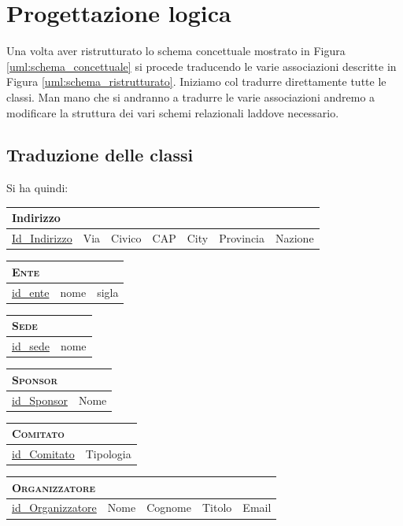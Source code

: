\section{Progettazione logica}
Una volta aver ristrutturato lo schema concettuale mostrato in Figura \ref{uml:schema_concettuale} si procede traducendo le varie associazioni descritte in Figura \ref{uml:schema_ristrutturato}. Iniziamo col tradurre direttamente tutte le classi. Man mano che si andranno a tradurre le varie associazioni andremo a modificare la struttura dei vari schemi relazionali laddove necessario.
\subsection{Traduzione delle classi}
Si ha quindi:

	\begin{tabular}{|l|l|l|l|l|l|l|}
		\multicolumn{7}{l}{Indirizzo} \\
		\hline
		\underline{Id\_Indirizzo} & Via & Civico & CAP & City & Provincia & Nazione \\ \hline
	\end{tabular}
	
	\begin{tabular}{|l|l|l|}
		\multicolumn{3}{l}{\textsc{Ente}}\\ \hline
		\underline{id\_ente} & nome & sigla \\ \hline
	\end{tabular}


	\begin{tabular}{|l|l|}
		\multicolumn{2}{l}{\textsc{Sede}} \\ \hline
		\underline{id\_sede} & nome \\ \hline
	\end{tabular}


	\begin{tabular}{|l|l|}
		\multicolumn{2}{l}{\textsc{Sponsor}} \\ \hline
		\underline{id\_Sponsor} & Nome \\ \hline
	\end{tabular}


	\begin{tabular}{|l|l|}
		\multicolumn{2}{l}{\textsc{Comitato}} \\ \hline
		\underline{id\_Comitato} & Tipologia \\ \hline
	\end{tabular}


	\begin{tabular}{|l|l|l|l|l|}
		\multicolumn{5}{l}{\textsc{Organizzatore}} \\ \hline
		\underline{id\_Organizzatore} & Nome & Cognome & Titolo & Email \\ \hline
	\end{tabular}


